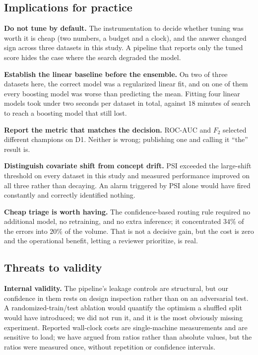 \documentclass{ieeeaccess}
\begin{document}
\subsection{Implications for practice}
\textbf{Do not tune by default.} The instrumentation to decide whether tuning was worth it is cheap (two numbers, a budget and a clock), and the answer changed sign across three datasets in this study. A pipeline that reports only the tuned score hides the case where the search degraded the model.

\textbf{Establish the linear baseline before the ensemble.} On two of three datasets here, the correct model was a regularized linear fit, and on one of them every boosting model was worse than predicting the mean. Fitting four linear models took under two seconds per dataset in total, against $18$ minutes of search to reach a boosting model that still lost.

\textbf{Report the metric that matches the decision.} ROC-AUC and $F_2$ selected different champions on D1. Neither is wrong; publishing one and calling it ``the'' result is.

\textbf{Distinguish covariate shift from concept drift.} PSI exceeded the large-shift threshold on every dataset in this study and measured performance improved on all three rather than decaying. An alarm triggered by PSI alone would have fired constantly and correctly identified nothing.

\textbf{Cheap triage is worth having.} The confidence-based routing rule required no additional model, no retraining, and no extra inference; it concentrated $34\%$ of the errors into $20\%$ of the volume. That is not a decisive gain, but the cost is zero and the operational benefit, letting a reviewer prioritize, is real.

\subsection{Threats to validity}
\textbf{Internal validity.} The pipeline's leakage controls are structural, but our confidence in them rests on design inspection rather than on an adversarial test. A randomized-train/test ablation would quantify the optimism a shuffled split would have introduced; we did not run it, and it is the most obviously missing experiment. Reported wall-clock costs are single-machine measurements and are sensitive to load; we have argued from ratios rather than absolute values, but the ratios were measured once, without repetition or confidence intervals.
\end{document}
